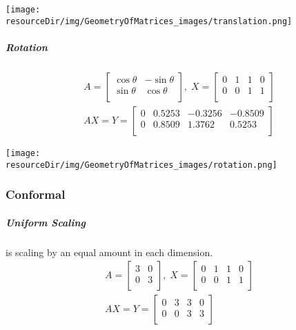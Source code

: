 \documentclass[../MathsNotesBase.tex]{subfiles}
\begin{document}
{		\begin{center}
		\texttt{[image: \\resourceDir/img/GeometryOfMatrices\_images/translation.png]}
		\end{center}
		
		\subparagraph{Rotation}
		\begin{align*}
		A =
		\begin{bmatrix}    
		\cos{\theta}  &  -\sin{\theta} \\
		\sin{\theta}  &  \cos{\theta} \\		
		\end{bmatrix}
		,\; X = 
		\begin{bmatrix}  
		0   &  1  &   1  &   0 \\
		0   &  0  &   1  &   1	\\	
		\end{bmatrix} \\[10pt]
		AX = Y = 
		\begin{bmatrix}   
		0  &   0.5253  &  -0.3256  &  -0.8509 \\
		0  &   0.8509  &   1.3762  &   0.5253	\\
		\end{bmatrix}
		\end{align*}
	
		\begin{center}
		\texttt{[image: \\resourceDir/img/GeometryOfMatrices\_images/rotation.png]}
		\end{center}
		
		\subsubsection{Conformal}
		\subparagraph{Uniform Scaling} is scaling by an equal amount in each dimension.
		\begin{align*}
		A =
		\begin{bmatrix}    
		3  &  0 \\
		0  &  3 \\		
		\end{bmatrix}
		,\; X = 
		\begin{bmatrix}  
		0   &  1  &   1  &   0 \\
		0   &  0  &   1  &   1	\\	
		\end{bmatrix} \\[10pt]
		AX = Y = 
		\begin{bmatrix}   
		0  &   3  &  3  &  0 \\
		0  &   0  &  3  &  3 \\
		\end{bmatrix}
		\end{align*}
	
}
\end{document}
